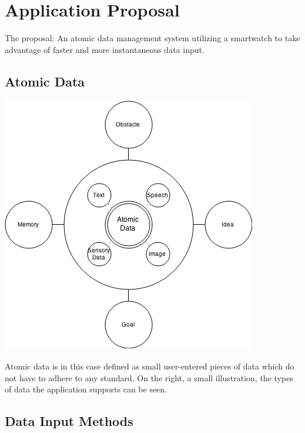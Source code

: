 \section{Application Proposal}

The proposal: An atomic data management system utilizing a smartwatch to take advantage of faster and more instantaneous data input.

\subsection{Atomic Data}

\begin{center}
\includegraphics[width=0.9\linewidth]{00_resources/atomic_data.png}
\end{center}

Atomic data is in this case defined as small user-entered pieces of data which do not have to adhere to any standard.
On the right, a small illustration, the types of data the application supports can be seen.

\subsection{Data Input Methods}

